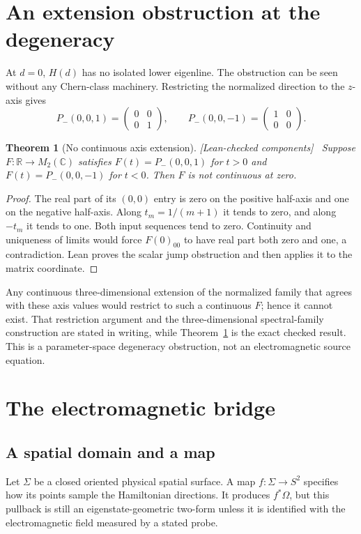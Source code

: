 \documentclass[11pt]{article}
\newtheorem{theorem}{Theorem}[section]
\theoremstyle{definition}\newtheorem{definition}[theorem]{Definition}
\theoremstyle{remark}\newtheorem{remark}[theorem]{Remark}
\newcommand{\R}{\mathbb{R}}
\newcommand{\C}{\mathbb{C}}
\newcommand{\checked}{\textnormal{\small[Lean-checked components]}\ }
\begin{document}
\section{An extension obstruction at the degeneracy}
At $d=0$, $H(d)$ has no isolated lower eigenline. The obstruction can be seen without any Chern-class machinery. Restricting the normalized direction to the $z$-axis gives
\begin{equation}\label{eq:axis}
 P_-(0,0,1)=\begin{pmatrix}0&0\\0&1\end{pmatrix},\qquad
 P_-(0,0,-1)=\begin{pmatrix}1&0\\0&0\end{pmatrix}.
\end{equation}
\begin{theorem}[No continuous axis extension]\label{thm:axis}\checked
Suppose $F:\R\to M_2(\C)$ satisfies $F(t)=P_-(0,0,1)$ for $t>0$ and $F(t)=P_-(0,0,-1)$ for $t<0$. Then $F$ is not continuous at zero.
\end{theorem}
\begin{proof}
The real part of its $(0,0)$ entry is zero on the positive half-axis and one on the negative half-axis. Along $t_m=1/(m+1)$ it tends to zero, and along $-t_m$ it tends to one. Both input sequences tend to zero. Continuity and uniqueness of limits would force $F(0)_{00}$ to have real part both zero and one, a contradiction. Lean proves the scalar jump obstruction and then applies it to the matrix coordinate.
\end{proof}
Any continuous three-dimensional extension of the normalized family that agrees with these axis values would restrict to such a continuous $F$; hence it cannot exist. That restriction argument and the three-dimensional spectral-family construction are stated in writing, while Theorem~\ref{thm:axis} is the exact checked result. This is a parameter-space degeneracy obstruction, not an electromagnetic source equation.

\section{The electromagnetic bridge}\label{sec:physical}
\subsection{A spatial domain and a map}
Let $\Sigma$ be a closed oriented physical spatial surface. A map $f:\Sigma\to S^2$ specifies how its points sample the Hamiltonian directions. It produces $f^*\Omega$, but this pullback is still an eigenstate-geometric two-form unless it is identified with the electromagnetic field measured by a stated probe.
\end{document}
